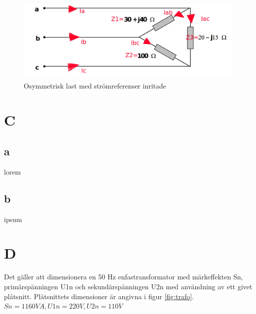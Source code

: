 \documentclass{article}
\begin{document}
  \begin{figure}[H]
  \begin{center}
  \includegraphics[width=1\textwidth]{img/osymmetrisk-last1.jpg} %
  \caption{Osymmetrisk last med strömreferenser inritade}
  \label{fig:osymm}
  \end{center}
  \end{figure}


\section{C}
\subsection{a}
lorem
\subsection{b}
ipsum
\section{D}
Det gäller att dimensionera en 50 Hz enfastransformator med märkeffekten Sn, primärspänningen
U1n och sekundärspänningen U2n med användning av ett givet plåtsnitt. Plåtsnittets dimensioner
är angivna i figur \ref{fig:trafo}.
$Sn = 1160 VA, U1n = 220 V,U2n = 110 V$
\end{document}
